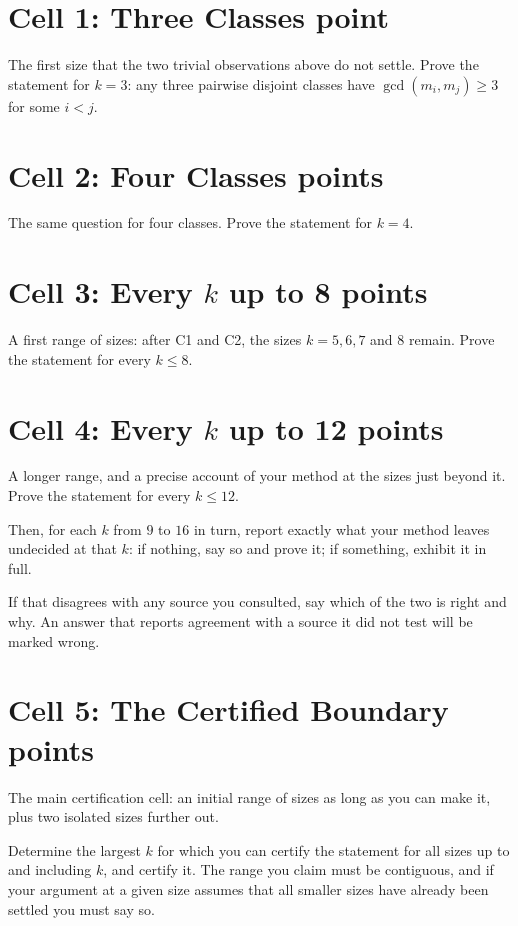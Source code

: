 \documentclass[11pt]{article}
\theoremstyle{definition}
\newcommand{\cell}[3]{%
  \section*{Cell #1: #2\hfill{\normalsize\mdseries #3}}}
\begin{document}
\cell{1}{Three Classes}{1 point}

The first size that the two trivial observations above do not settle.
Prove the statement for $k = 3$: any three pairwise disjoint classes
have $\gcd(m_i, m_j) \geq 3$ for some $i < j$.

\cell{2}{Four Classes}{2 points}

The same question for four classes. Prove the statement for $k = 4$.

\cell{3}{Every $k$ up to 8}{3 points}

A first range of sizes: after C1 and C2, the sizes $k = 5, 6, 7$ and
$8$ remain. Prove the statement for every $k \leq 8$.

\cell{4}{Every $k$ up to 12}{5 points}

A longer range, and a precise account of your method at the sizes
just beyond it. Prove the statement for every $k \leq 12$.

Then, for each $k$ from $9$ to $16$ in turn, report exactly what your
method leaves undecided at that $k$: if nothing, say so and prove it;
if something, exhibit it in full.

If that disagrees with any source you consulted, say which of the two
is right and why. An answer that reports agreement with a source it
did not test will be marked wrong.

\cell{5}{The Certified Boundary}{8 points}

The main certification cell: an initial range of sizes as long as you
can make it, plus two isolated sizes further out.

Determine the largest $k$ for which you can certify the statement for
all sizes up to and including $k$, and certify it. The range you
claim must be contiguous, and if your argument at a given size
assumes that all smaller sizes have already been settled you must say
so.
\end{document}
